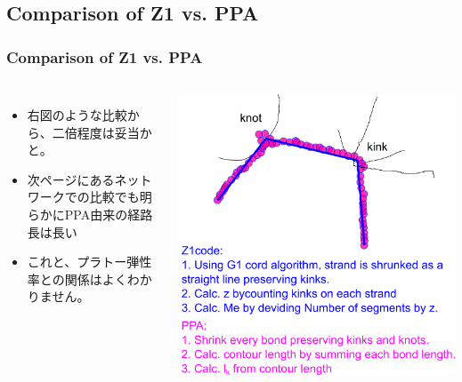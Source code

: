 \documentclass[12pt, dvipdfmx]{beamer}
\begin{document}
\subsection{Comparison of Z1 vs. PPA}
\begin{frame}
    \frametitle{Comparison of Z1 vs. PPA}
    \begin{columns}[T, onlytextwidth]
            \begin{itemize}
                \item 右図のような比較から、二倍程度は妥当かと。
                \item 次ページにあるネットワークでの比較でも明らかにPPA由来の経路長は長い
                \item これと、プラトー弾性率との関係はよくわかりません。
            \end{itemize}

        \centering
        \includegraphics[width=\textwidth]{z1_PPA.png}
    \end{columns}
\end{frame}
\end{document}
